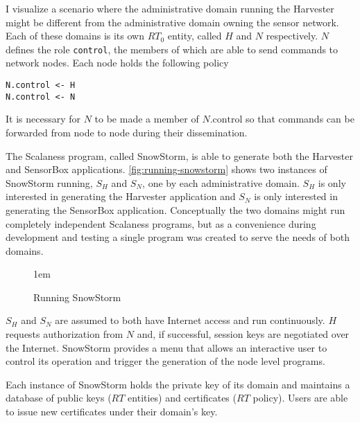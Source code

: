 I visualize a scenario where the administrative domain running the Harvester might be different
from the administrative domain owning the sensor network. Each of these domains is its own
$RT_0$ entity, called $H$ and $N$ respectively. $N$ defines the role \texttt{control}, the
members of which are able to send commands to network nodes. Each node holds the following
policy
\begin{Verbatim}
N.control <- H
N.control <- N
\end{Verbatim}

It is necessary for $N$ to be made a member of $N.\textrm{control}$ so that commands can be
forwarded from node to node during their dissemination. 

The Scalaness program, called SnowStorm, is able to generate both the Harvester and SensorBox
applications. \autoref{fig:running-snowstorm} shows two instances of SnowStorm running, $S_H$
and $S_N$, one by each administrative domain. $S_H$ is only interested in generating the
Harvester application and $S_N$ is only interested in generating the SensorBox application.
Conceptually the two domains might run completely independent Scalaness programs, but as a
convenience during development and testing a single program was created to serve the needs of
both domains.

\begin{figure}[htbp]
  
  \centerline{\raise 1em\box\graph}
  \caption{Running SnowStorm}
  \label{fig:running-snowstorm}
\end{figure}

$S_H$ and $S_N$ are assumed to both have Internet access and run continuously. $H$ requests
authorization from $N$ and, if successful, session keys are negotiated over the Internet.
SnowStorm provides a menu that allows an interactive user to control its operation and trigger
the generation of the node level programs.

Each instance of SnowStorm holds the private key of its domain and maintains a database of
public keys ($RT$ entities) and certificates ($RT$ policy). Users are able to issue new
certificates under their domain's key.

